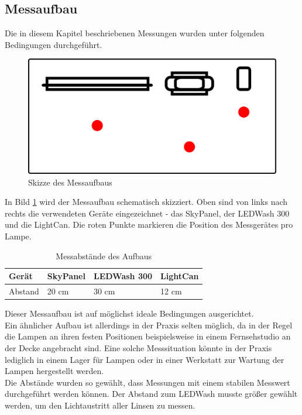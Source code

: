 \documentclass[11pt]{scrartcl}
\begin{document}
\subsection{Messaufbau}
Die in diesem Kapitel beschriebenen Messungen wurden unter folgenden Bedingungen durchgeführt.
\begin{figure}[H]
    \begin{center}
        \includegraphics[width=.8\textwidth]{images/meassureScenario.png} %
    \end{center}
    \caption{Skizze des Messaufbaus} \label{fig:measureScribble}
\end{figure}
\noindent
In Bild \ref{fig:measureScribble} wird der Messaufbau schematisch skizziert. Oben sind von links nach rechts die verwendeten Geräte eingezeichnet -
das SkyPanel, der LEDWash 300 und die LightCan. Die roten Punkte markieren die Position des Messgerätes pro Lampe.
\begin{table}[H]
    \begin{tabularx}{\textwidth}{|l|X|X|X|}
        \hline Gerät  & SkyPanel & LEDWash 300 & LightCan\\\hline
        Abstand       & 20 cm    & 30 cm       & 12 cm   \\\hline
    \end{tabularx}
    \caption{Messabstände des Aufbaus}
\end{table}
\noindent
Dieser Messaufbau ist auf möglichst ideale Bedingungen ausgerichtet.\\
Ein ähnlicher Aufbau ist allerdings in der Praxis selten möglich, da in der Regel die Lampen an ihren festen Positionen beispielsweise in einem
Fernsehstudio an der Decke angebracht sind. Eine solche Messsituation könnte in der Praxis lediglich in einem Lager für Lampen oder in einer
Werkstatt zur Wartung der Lampen hergestellt werden.\\
Die Abstände wurden so gewählt, dass Messungen mit einem stabilen Messwert durchgeführt werden können. Der Abstand zum LEDWash musste größer
gewählt werden, um den Lichtaustritt aller Linsen zu messen.\\
\end{document}
